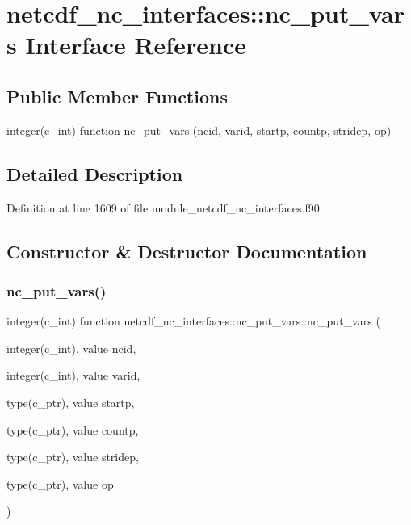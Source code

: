 \hypertarget{interfacenetcdf__nc__interfaces_1_1nc__put__vars}{}\section{netcdf\+\_\+nc\+\_\+interfaces\+:\+:nc\+\_\+put\+\_\+vars Interface Reference}
\label{interfacenetcdf__nc__interfaces_1_1nc__put__vars}
\subsection*{Public Member Functions}
\begin{DoxyCompactItemize}
\item 
integer(c\+\_\+int) function \hyperlink{interfacenetcdf__nc__interfaces_1_1nc__put__vars_a8a930413d8542aacb5aa2111aae08ede}{nc\+\_\+put\+\_\+vars} (ncid, varid, startp, countp, stridep, op)
\end{DoxyCompactItemize}


\subsection{Detailed Description}


Definition at line 1609 of file module\+\_\+netcdf\+\_\+nc\+\_\+interfaces.\+f90.



\subsection{Constructor \& Destructor Documentation}
\mbox{\label{interfacenetcdf__nc__interfaces_1_1nc__put__vars_a8a930413d8542aacb5aa2111aae08ede}} 
\subsubsection{\texorpdfstring{nc\+\_\+put\+\_\+vars()}{nc\_put\_vars()}}
{\footnotesize\ttfamily integer(c\+\_\+int) function netcdf\+\_\+nc\+\_\+interfaces\+::nc\+\_\+put\+\_\+vars\+::nc\+\_\+put\+\_\+vars (\begin{DoxyParamCaption}\item[{integer(c\+\_\+int), value}]{ncid,  }\item[{integer(c\+\_\+int), value}]{varid,  }\item[{type(c\+\_\+ptr), value}]{startp,  }\item[{type(c\+\_\+ptr), value}]{countp,  }\item[{type(c\+\_\+ptr), value}]{stridep,  }\item[{type(c\+\_\+ptr), value}]{op }\end{DoxyParamCaption})}



